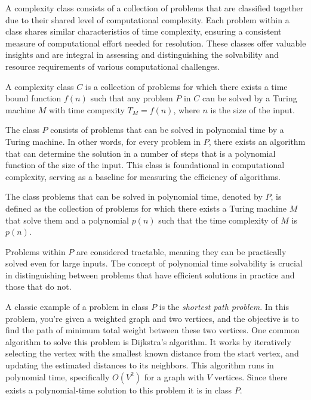 A complexity class consists of a collection of problems that are classified together due to their shared level of computational complexity. Each problem within a class shares similar characteristics of time complexity, ensuring a consistent measure of computational effort needed for resolution. These classes offer valuable insights and are integral in assessing and distinguishing the solvability and resource requirements of various computational challenges.

\begin{definition}
A complexity class $C$ is a collection of problems for which there exists a time bound function $f(n)$ such that any problem $P$ in $C$ can be solved by a Turing machine $M$ with time compexity $T_M = f(n)$, where $n$ is the size of the input.
\end{definition}

The class $P$ consists of problems that can be solved in polynomial time by a Turing machine. In other words, for every problem in $P$, there exists an algorithm that can determine the solution in a number of steps that is a polynomial function of the size of the input. This class is foundational in computational complexity, serving as a baseline for measuring the efficiency of algorithms. 

\begin{definition}
The class problems that can be solved in polynomial time, denoted by $P$, is defined as the collection of problems for which there exists a Turing machine $M$ that solve them and a polynomial $p(n)$ such that the time complexity of $M$ is $p(n)$.
\end{definition}

Problems within $P$ are considered tractable, meaning they can be practically solved even for large inputs. The concept of polynomial time solvability is crucial in distinguishing between problems that have efficient solutions in practice and those that do not.

\begin{example}
A classic example of a problem in class $P$ is the \emph{shortest path problem}. In this problem, you're given a weighted graph and two vertices, and the objective is to find the path of minimum total weight between these two vertices. One common algorithm to solve this problem is Dijkstra's algorithm. It works by iteratively selecting the vertex with the smallest known distance from the start vertex, and updating the estimated distances to its neighbors. This algorithm runs in polynomial time, specifically $O(V^2)$ for a graph with $V$ vertices. Since there exists a polynomial-time solution to this problem it is in class $P$.
\end{example}


